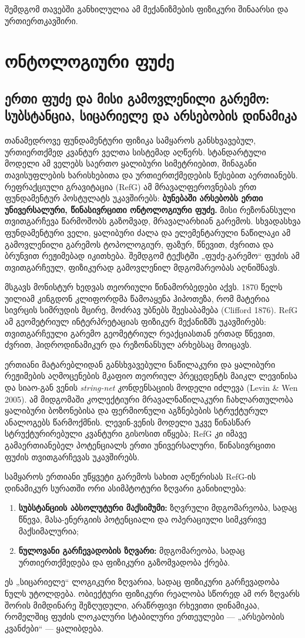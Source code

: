 \documentclass[11pt,a4paper]{article}
\begin{document}
შემდგომ თავებში განხილულია ამ მექანიზმების ფიზიკური შინაარსი და ურთიერთკავშირი.


\section{ონტოლოგიური ფუძე}

\subsection{ერთი ფუძე და მისი გამოვლენილი გარემო: სუბსტანცია, სიცარიელე და არსებობის დინამიკა}

თანამედროვე ფუნდამენტური ფიზიკა სამყაროს განსხვავებულ, ურთიერთქმედ კვანტურ ველთა სისტემად აღწერს. სტანდარტული მოდელი ამ ველებს საერთო ყალიბური სიმეტრიებით, შინაგანი თავისუფლების ხარისხებითა და ურთიერთქმედების წესებით აერთიანებს. რეფრაქციული გრავიტაცია (RefG) ამ მრავალფეროვნებას ერთ ფუნდამენტურ პოსტულატს უკავშირებს: \textbf{ბუნებაში არსებობს ერთი უნივერსალური, წინასივრცითი ონტოლოგიური ფუძე.} მისი რეზონანსული თვითგარჩევა წარმოშობს გაზომვად, მრავალარხიან გარემოს. სხვადასხვა ფუნდამენტური ველი, ყალიბური ძალა და ელემენტარული ნაწილაკი ამ გამოვლენილი გარემოს ტოპოლოგიურ, ფაზურ, წნევით, ძვრითა და ბრუნვით რეჟიმებად იკითხება. შემდგომ ტექსტში „ფუძე-გარემო“ ფუძის ამ თვითგარჩეულ, ფიზიკურად გამოვლენილ მდგომარეობას აღნიშნავს.

მსგავს მონისტურ ხედვას თეორიული წინამორბედები აქვს. 1870 წელს უილიამ კინგდონ კლიფორდმა წამოაყენა ჰიპოთეზა, რომ მატერია სივრცის სიმრუდის მცირე, მოძრავ უბნებს შეესაბამება (Clifford 1876). RefG ამ გეომეტრიულ ინტერპრეტაციას ფიზიკურ მექანიზმს უკავშირებს: თვითგარჩეული გარემო გეომეტრიულ რეაქციასთან ერთად წნევით, ძვრით, ჰიდროდინამიკურ და რეზონანსულ არხებსაც მოიცავს.

ერთიანი მატარებლიდან განსხვავებული ნაწილაკური და ყალიბური რეჟიმების აღმოცენების მკაფიო თეორიულ პრეცედენტს მაიკლ ლევინისა და სიაო-გან ვენის \emph{string-net} კონდენსაციის მოდელი იძლევა (Levin \& Wen 2005). ამ მიდგომაში კოლექტიური მრავალნაწილაკური ჩახლართულობა ყალიბური ბოზონებისა და ფერმიონული აგზნებების სტრუქტურულ ანალოგებს წარმოქმნის. ლევინ-ვენის მოდელი უკვე წინასწარ სტრუქტურირებული კვანტური გისოსით იწყება; RefG კი იმავე გამაერთიანებელ პოტენციალს ერთი უნივერსალური, წინასივრცითი ფუძის თვითგარჩევას უკავშირებს.

სამყაროს ერთიანი უწყვეტი გარემოს სახით აღწერისას RefG-ის დინამიკურ სურათში ორი ასიმპტოტური ზღვარი განიხილება:

\begin{enumerate}[label=\arabic*.]
\item \textbf{სუბსტანციის აბსოლუტური მაქსიმუმი:} ზღვრული მდგომარეობა, სადაც წნევა, მასა-ენერგიის პოტენციალი და ოპერაციული სიმკვრივე მაქსიმალურია;
\item \textbf{ნულოვანი გარჩევადობის ზღვარი:} მდგომარეობა, სადაც ურთიერთქმედება და ფიზიკური გაზომვადობა ქრება.

\end{enumerate}
ეს „სიცარიელე“ ლოგიკური ზღვარია, სადაც ფიზიკური გარჩევადობა ნულს უტოლდება. ობიექტური ფიზიკური რეალობა სწორედ ამ ორ ზღვარს შორის მიმდინარე შეზღუდული, არაწრფივი რხევითი დინამიკაა, რომელშიც ფუძის ლოკალური სტაბილური ერთეულები — „არსებობის კვანძები“ — ყალიბდება.
\end{document}
